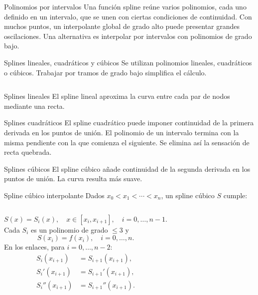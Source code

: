 \documentclass[original_version/main.tex]{subfiles}
\begin{document}
\begin{frame}[t]{Polinomios por intervalos}
Una función spline reúne varios polinomios, cada uno definido en un intervalo, que se unen con ciertas condiciones de continuidad.
\bigskip
Con muchos puntos, un interpolante global de grado alto puede presentar grandes oscilaciones.
\bigskip
Una alternativa es interpolar por intervalos con polinomios de grado bajo.
\end{frame}
\begin{frame}[t]{Splines lineales, cuadráticos y cúbicos}
\small Se utilizan polinomios lineales, cuadráticos o cúbicos. Trabajar por tramos de grado bajo simplifica el cálculo.
\begin{columns}\end{columns}
\end{frame}
\begin{frame}[t]{Splines lineales}
El spline lineal aproxima la curva entre cada par de nodos mediante una recta.
\end{frame}
\begin{frame}[t]{Splines cuadráticos}
El spline cuadrático puede imponer continuidad de la primera derivada en los puntos de unión.
\bigskip
El polinomio de un intervalo termina con la misma pendiente con la que comienza el siguiente.
\bigskip
Se elimina así la sensación de recta quebrada.
\end{frame}
\begin{frame}[t]{Splines cúbicos}
\small El spline cúbico añade continuidad de la segunda derivada en los puntos de unión. La curva resulta más suave.
\end{frame}
\begin{frame}[t]{Spline cúbico interpolante}
\small Dados $x_0<x_1<\cdots<x_n$, un spline cúbico $S$ cumple:
\begin{columns}[T]
\[S(x)=S_i(x),\quad x\in[x_i,x_{i+1}],\quad i=0,\ldots,n-1.\]
Cada $S_i$ es un polinomio de grado $\le3$ y
\[S(x_i)=f(x_i),\quad i=0,\ldots,n.\]
En los enlaces, para $i=0,\ldots,n-2$:
\begin{align*}S_i(x_{i+1})&=S_{i+1}(x_{i+1}),\\
S_i'(x_{i+1})&=S_{i+1}'(x_{i+1}),\\
S_i''(x_{i+1})&=S_{i+1}''(x_{i+1}).\end{align*}
\end{columns}
\end{frame}
\end{document}
